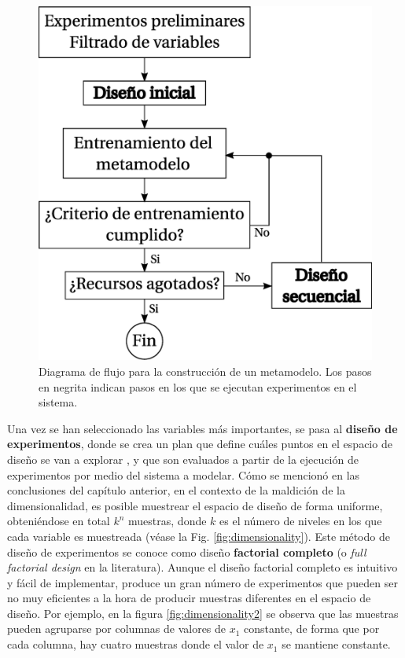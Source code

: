 \begin{figure}[t]
\centering
\includegraphics[scale=0.28]{../img/Construccion_de_un_Metamodelo/metamodelingsteps.eps}
\caption{Diagrama de flujo para la construcción de un metamodelo. Los pasos en negrita indican pasos en los que se ejecutan experimentos en el sistema.}
\label{fig:metamodelingsteps}
\end{figure}

Una vez se han seleccionado las variables más importantes, se pasa al \textbf{diseño de experimentos}, donde se crea un plan que define cuáles puntos en el espacio de diseño se van a explorar \cite{montgomery2013}, y que son evaluados a partir de la ejecución de experimentos por medio del sistema a modelar. Cómo se mencionó en las conclusiones del capítulo anterior, en el contexto de la maldición de la dimensionalidad, es posible muestrear el espacio de diseño de forma uniforme, obteniéndose en total $k^n$ muestras, donde $k$ es el número de niveles en los que cada variable es muestreada (véase la Fig. \ref{fig:dimensionality}). Este método de diseño de experimentos se conoce como diseño \textbf{factorial completo} (o \textit{full factorial design} en la literatura). Aunque el diseño factorial completo es intuitivo y fácil de implementar, produce un gran número de experimentos que pueden ser no muy eficientes a la hora de producir muestras diferentes en el espacio de diseño. Por ejemplo, en la figura \ref{fig:dimensionality2} se observa que las muestras pueden agruparse por columnas de valores de $x_1$ constante, de forma que por cada columna, hay cuatro muestras donde el valor de $x_1$ se mantiene constante.

